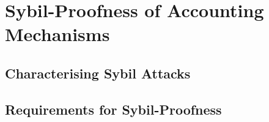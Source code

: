 \chapter{Sybil-Proofness of Accounting Mechanisms}
\label{chap:Sybil-Proofness of Accounting Mechanisms}



\section{Characterising Sybil Attacks}
\label{sec:Characterising Sybil Attacks}



\section{Requirements for Sybil-Proofness}
\label{sec:Requirements for Sybil-Proofness}



